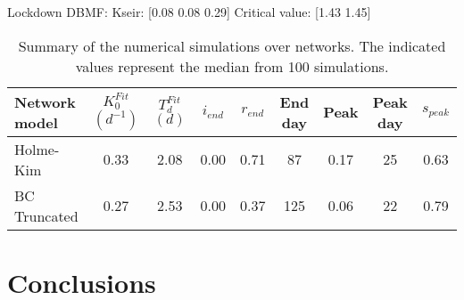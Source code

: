 \documentclass[DIV=12, BCOR=0pt]{scrartcl}  %
\begin{document}
Lockdown DBMF:
Kseir: [0.08 0.08 0.29]
Critical value: [1.43 1.45]


	\begin{table}[h!]
		\centering
		\caption{Summary of the numerical simulations over networks. The indicated values represent the median from 100 simulations.}
		\label{tab:lock_results}
		\begin{tabular}{lcccccccc}
			\toprule
			Network model & $K_0^{Fit}$ $(d^{-1})$ & $T_d^{Fit}$ $(d)$ & $i_{end}$ & $r_{end}$ & End day & Peak  & Peak day & $s_{peak}$\\
			\midrule
		 	Holme-Kim 		&    0.33 &   2.08 &  0.00 &  0.71 &  	 87 &  0.17 &   25 &	0.63\\
			BC Truncated	&    0.27 &   2.53 &  0.00 &  0.37 & 		125 &  0.06 &   22 &	0.79\\
			
			
			\bottomrule
		\end{tabular}
	\end{table}
	
	
	\section{Conclusions}
%
%		
  \footnotesize
	
\end{document}
